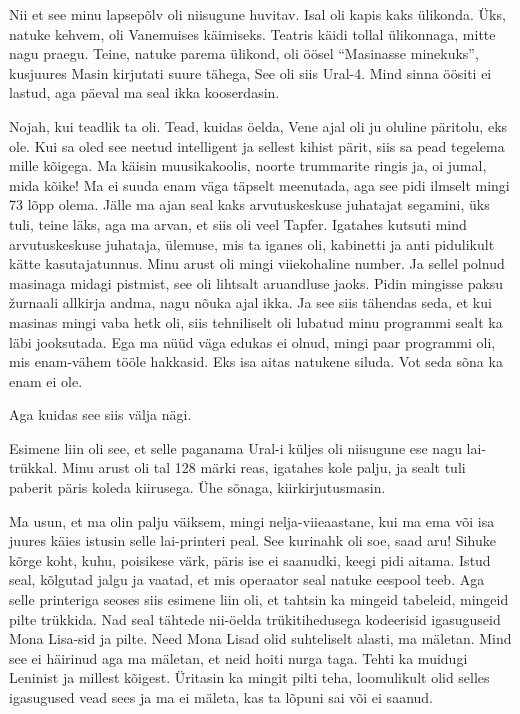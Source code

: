 Nii et see minu lapsepõlv oli niisugune huvitav. Isal oli kapis kaks ülikonda. 
Üks, natuke kehvem, oli Vanemuises käimiseks. Teatris käidi tollal ülikonnaga, 
mitte nagu praegu. Teine, natuke parema ülikond, oli öösel \enquote{Masinasse 
minekuks}, kusjuures Masin kirjutati suure tähega, See oli siis 
Ural-4. Mind sinna öösiti ei lastud, aga  päeval ma seal 
ikka kooserdasin. 


Nojah, kui teadlik ta oli. Tead, kuidas öelda, Vene ajal oli ju oluline 
päritolu, eks ole. Kui sa oled see neetud intelligent ja sellest kihist pärit,  
siis sa pead tegelema mille kõigega. Ma käisin muusikakoolis, noorte trummarite 
ringis ja, oi jumal, mida kõike! Ma ei suuda enam väga täpselt meenutada, aga 
see pidi ilmselt mingi 73 lõpp olema. Jälle ma ajan seal kaks 
arvutuskeskuse juhatajat segamini, üks tuli, 
teine läks, aga ma arvan, et siis oli veel Tapfer. Igatahes kutsuti mind arvutuskeskuse juhataja, ülemuse, 
 mis ta iganes oli, kabinetti ja anti pidulikult kätte kasutajatunnus. Minu 
arust oli mingi viiekohaline number. Ja sellel polnud masinaga midagi pistmist, 
see oli lihtsalt aruandluse jaoks. Pidin mingisse paksu žurnaali allkirja 
andma, nagu nõuka ajal ikka. Ja see siis tähendas seda, et kui masinas mingi 
vaba hetk oli, siis tehniliselt oli lubatud minu programmi sealt ka läbi 
jooksutada. Ega ma nüüd väga edukas ei olnud, mingi paar programmi oli, mis 
enam-vähem tööle hakkasid. Eks isa aitas natukene siluda. Vot seda sõna ka enam 
ei ole. 

Aga kuidas see siis välja nägi. 

Esimene liin oli see, et selle paganama Ural-i küljes oli niisugune 
ese nagu lai-trükkal. Minu arust oli tal 128 märki reas, igatahes kole palju, 
ja sealt tuli paberit päris koleda kiirusega. Ühe sõnaga, kiirkirjutusmasin. 

Ma usun, et ma olin palju väiksem, mingi nelja-viieaastane, kui ma ema või isa 
juures käies istusin selle lai-printeri peal. See kurinahk oli soe, saad aru! 
Sihuke kõrge koht, kuhu, poisikese värk, päris ise ei saanudki, keegi pidi 
aitama. Istud seal, kõlgutad jalgu ja vaatad, et mis operaator seal natuke 
eespool teeb. Aga selle printeriga seoses siis esimene liin oli, et tahtsin ka 
mingeid tabeleid, mingeid pilte trükkida. Nad seal tähtede nii-öelda  
trükitihedusega kodeerisid  igasuguseid Mona Lisa-sid ja pilte. Need Mona Lisad 
olid suhteliselt alasti, ma mäletan. Mind see ei häirinud aga ma mäletan, et 
neid hoiti nurga taga. Tehti ka muidugi Leninist ja millest kõigest. Üritasin 
ka mingit pilti teha, loomulikult olid selles igasugused vead sees ja ma ei 
mäleta, kas ta lõpuni sai või ei saanud. 

